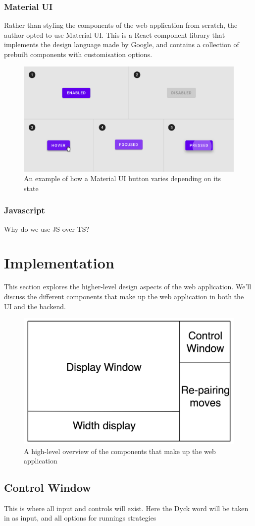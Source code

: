 \subsubsection{Material UI}
 Rather than styling the components of the web application from scratch, the author opted to use Material UI. This is a React component library that implements the design language made by Google, and contains a collection of prebuilt components with customisation options.

\begin{figure}[H]
    \centering
    \includegraphics[scale=0.35]{./images/materialUIbutton.png}
    \caption{An example of how a Material UI button varies depending on its state \cite{materialUIbuttons}}
\end{figure}

\subsubsection{Javascript}
Why do we use JS over TS?

\section{Implementation}
This section explores the higher-level design aspects of the web application. We'll discuss the different components that make up the web application in both the UI and the backend.

\begin{figure}[H]
    \centering
    \includegraphics[scale=0.1]{./figures/webBreakdown.png}
    \caption{A high-level overview of the components that make up the web application}
\end{figure}

\subsection{Control Window}
This is where all input and controls will exist. Here the Dyck word will be taken in as input, and all options for runnings strategies
